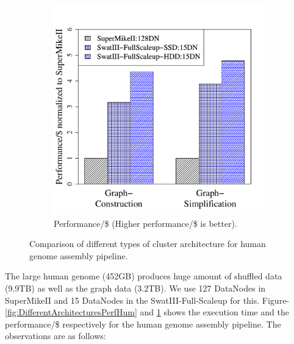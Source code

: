 \documentclass[10pt, conference, compsocconf]{IEEEtran}
\begin{document}
\begin{figure}[htb]
\begin{subfigure}[b]{0.23\textwidth}
                \includegraphics[width=\textwidth]{Figure/PerormanceData/Plots/PerfPerDollarDiffArchHum.pdf}
                \caption{Performance/\$ (Higher performance/\$ is better).}
                \label{fig:DifferentArchitecturesPerfPerDollarHum}
        \end{subfigure}
        \caption{Comparison of different types of cluster architecture for human genome assembly pipeline.}
  \label{fig:DifferentArchitecturesHum}
  \vspace{-.8em}
\end{figure}
The large human genome (452GB)  produces huge amount of shuffled data (9.9TB) as well as the graph data (3.2TB). We use 127 DataNodes in SuperMikeII and 15 DataNodes in the SwatIII-Full-Scaleup for this. Figure-\ref{fig:DifferentArchitecturesPerfHum} and \ref{fig:DifferentArchitecturesPerfPerDollarHum} shows the execution time and the performance/\$ respectively for the human genome assembly pipeline. The observations are as follows:
\end{document}
